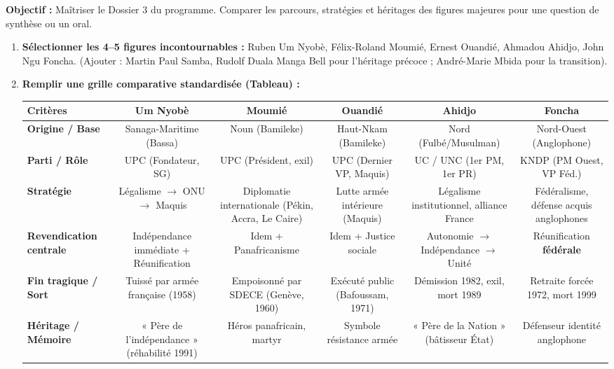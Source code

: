 \documentclass[11pt]{article}
\begin{document}
\begin{methode}
\textbf{Objectif :} Maîtriser le Dossier 3 du programme. Comparer les parcours, stratégies et héritages des figures majeures pour une question de synthèse ou un oral.
\begin{enumerate}
    \item \textbf{Sélectionner les 4--5 figures incontournables :} Ruben Um Nyobè, Félix-Roland Moumié, Ernest Ouandié, Ahmadou Ahidjo, John Ngu Foncha. (Ajouter : Martin Paul Samba, Rudolf Duala Manga Bell pour l'héritage précoce ; André-Marie Mbida pour la transition).
    \item \textbf{Remplir une grille comparative standardisée (Tableau) :}
        \begin{tabular}{|l|c|c|c|c|c|}\hline
        \textbf{Critères} & \textbf{Um Nyobè} & \textbf{Moumié} & \textbf{Ouandié} & \textbf{Ahidjo} & \textbf{Foncha} \\ \hline
        \textbf{Origine / Base} & Sanaga-Maritime (Bassa) & Noun (Bamileke) & Haut-Nkam (Bamileke) & Nord (Fulbé/Musulman) & Nord-Ouest (Anglophone) \\ \hline
        \textbf{Parti / Rôle} & UPC (Fondateur, SG) & UPC (Président, exil) & UPC (Dernier VP, Maquis) & UC / UNC (1er PM, 1er PR) & KNDP (PM Ouest, VP Féd.) \\ \hline
        \textbf{Stratégie} & Légalisme $\rightarrow$ ONU $\rightarrow$ Maquis & Diplomatie internationale (Pékin, Accra, Le Caire) & Lutte armée intérieure (Maquis) & Légalisme institutionnel, alliance France & Fédéralisme, défense acquis anglophones \\ \hline
        \textbf{Revendication centrale} & Indépendance immédiate + Réunification & Idem + Panafricanisme & Idem + Justice sociale & Autonomie $\rightarrow$ Indépendance $\rightarrow$ Unité & Réunification \textbf{fédérale} \\ \hline
        \textbf{Fin tragique / Sort} & Tuissé par armée française (1958) & Empoisonné par SDECE (Genève, 1960) & Exécuté public (Bafoussam, 1971) & Démission 1982, exil, mort 1989 & Retraite forcée 1972, mort 1999 \\ \hline
        \textbf{Héritage / Mémoire} & « Père de l'indépendance » (réhabilité 1991) & Héros panafricain, martyr & Symbole résistance armée & « Père de la Nation » (bâtisseur État) & Défenseur identité anglophone \\ \hline
        \end{tabular}

\end{enumerate}
\end{methode}
\end{document}
